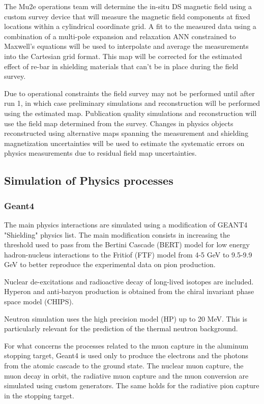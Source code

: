 The Mu2e operations team will determine the in-situ DS magnetic field using a custom survey device that will measure the magnetic field components at fixed locations within a cylindrical coordinate grid.  A fit to the measured data using a combination of a multi-pole expansion and relaxation ANN constrained to Maxwell's equations will be used to interpolate and average the measurements into the Cartesian grid format.  This map will be corrected for the estimated effect of re-bar in shielding materials that can't be in place during the field survey.

Due to operational constraints the field survey may not be performed until after run 1, in which case preliminary simulations and reconstruction will be performed using the estimated map. Publication quality simulations and reconstruction will use the field map determined from the survey. Changes in physics objects reconstructed using alternative maps spanning the measurement and shielding magnetization uncertainties will be used to estimate the systematic errors on physics measurements due to residual field map uncertainties.

\subsection{ Simulation of Physics processes}
\subsubsection{ Geant4}

The main physics interactions are simulated using a modification of GEANT4 "Shielding" physics list.  The main modification consists in increasing the threshold used to pass from the Bertini Cascade (BERT) model for low energy hadron-nucleus interactions to the Fritiof (FTF) model from 4-5 GeV to 9.5-9.9 GeV to better reproduce the experimental data on pion production.  

Nuclear de-excitations and radioactive decay of long-lived isotopes are included. 
Hyperon and anti-baryon production is obtained from the chiral invariant phase space model (CHIPS).

Neutron simulation uses the high precision model (HP) up to 20 MeV. This is particularly relevant for the prediction of the thermal neutron background.

For what concerns the processes related to the muon capture in the aluminum stopping target, Geant4 is used only to produce the electrons and the photons from the atomic cascade to the ground state. The nuclear muon capture, the muon decay in orbit, the radiative muon capture and the muon conversion are simulated using custom generators. The same holds for the radiative pion capture in the stopping target. 

